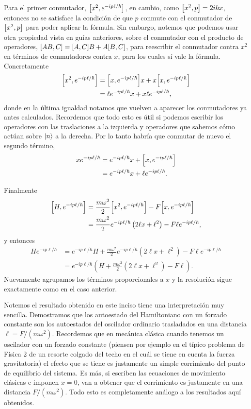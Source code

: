\documentclass[10pt, a4paper]{article}
\numberwithin{equation}{subsection}
\begin{document}
Para el primer conmutador, $\comm{x^2}{e^{-ip\ell/\hbar}}$, en cambio, como
$\comm{x^2}{p} = 2i\hbar x$, entonces no se satisface la condición de que $p$
conmute con el conmutador de $\comm{x^2}{p}$ para poder aplicar la fórmula.
Sin embargo, notemos que podemos usar otra propiedad vista en guías anteriores,
sobre el conmutador con el producto de operadores, $\comm{AB}{C} = \comm{A}{C}B
+ A\comm{B}{C}$, para reescribir el conmutador contra $x^2$ en términos de
conmutadores contra $x$, para los cuales sí vale la fórmula. Concretamente
\begin{align}
  \comm{x^2}{e^{-ip\ell/\hbar}} &= 
  \comm{x}{e^{-ip\ell/\hbar}}x + x\comm{x}{e^{-ip\ell/\hbar}} \\
  &= \ell e^{-ip\ell/\hbar}x + x\ell e^{-ip\ell/\hbar},
\end{align}
donde en la última igualdad notamos que vuelven a aparecer los conmutadores
ya antes calculados. Recordemos que todo esto es útil si podemos escribir los
operadores con las traslaciones a la izquierda y operadores que sabemos cómo
actúan sobre $\ket{n}$ a la derecha. Por lo tanto habría que conmutar de nuevo
el segundo término,
\begin{align}
  x e^{-ip\ell/\hbar} &= e^{-ip\ell/\hbar}x + \comm{x}{e^{-ip\ell/\hbar}} \\
  &= e^{-ip\ell/\hbar}x + \ell e^{-ip\ell/\hbar}.
\end{align}

Finalmente
\begin{align}
  \comm{H}{e^{-ip\ell/\hbar}} &=
    \frac{m\omega^2}{2}\comm{x^2}{e^{-ip\ell/\hbar}} -
    F\comm{x}{e^{-ip\ell/\hbar}} \\
  &= \frac{m\omega^2}{2} e^{-ip\ell/\hbar}\left(2\ell x  + \ell^2\right) -
    F\ell e^{-ip\ell/\hbar},
\end{align}
y entonces
\begin{align}
  He^{-ip\ell/\hbar} &= e^{-ip\ell/\hbar}H + \frac{m\omega^2}{2}
    e^{-ip\ell/\hbar}\left(2\ell x  + \ell^2\right) - F\ell e^{-ip\ell/\hbar}
    \\
  &= e^{-ip\ell/\hbar}\left(H + \frac{m\omega^2}{2} \left(2\ell x  +
    \ell^2\right) - F\ell\right).
\end{align}
Nuevamente agrupamos los términos proporcionales a $x$ y la resolución sigue
exactamente como en el caso anterior.

\bigbreak

Notemos el resultado obtenido en este inciso tiene una interpretación muy
sencilla. Demostramos que los autoestado del Hamiltoniano con un forzado
constante son los autoestados del oscilador ordinario trasladados en una
distancia $\ell = F / (m\omega^2)$. Recordemos que en mecánica clásica cuando
tenemos un oscilador con un forzado constante (piensen por ejemplo en el típico
problema de Física 2 de un resorte colgado del techo en el cuál se tiene en
cuenta la fuerza gravitatoria) el efecto que se tiene es justamente un simple
corrimiento del punto de equilibrio del sistema. Es más, si escriben las
ecuaciones de movimiento clásicas e imponen $\ddot{x} = 0$, van a obtener que
el corrimiento es justamente en una distancia $F / (m\omega^2)$. Todo esto es
completamente análogo a los resultados aquí obtenidos.
\end{document}
